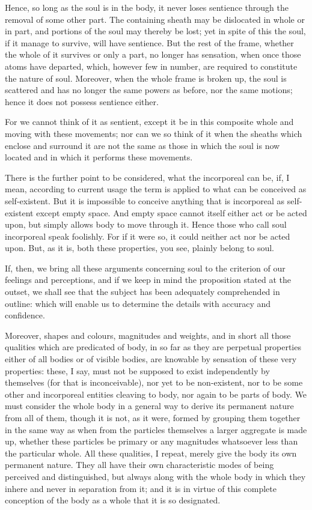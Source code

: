 \documentclass{stex}
\begin{document}
Hence, so long as the soul is in the body, it never loses sentience through the removal of some other part.
The containing sheath may be dislocated in whole or in part, and portions of the soul may thereby be lost; yet in spite of this the soul, if it manage to survive, will have sentience.
But the rest of the frame, whether the whole of it survives or only a part, no longer has sensation, when once those atoms have departed, which, however few in number, are required to constitute the nature of soul.
Moreover, when the whole frame is broken up, the soul is scattered and has no longer the same powers as before, nor the same motions; hence it does not possess sentience either.

For we cannot think of it as sentient, except it be in this composite whole and moving with these movements; nor can we so think of it when the sheaths which enclose and surround it are not the same as those in which the soul is now located and in which it performs these movements.

There is the further point to be considered, what the incorporeal can be, if, I mean, according to current usage the term is applied to what can be conceived as self-existent.
But it is impossible to conceive anything that is incorporeal as self-existent except empty space.
And empty space cannot itself either act or be acted upon, but simply allows body to move through it.
Hence those who call soul incorporeal speak foolishly.
For if it were so, it could neither act nor be acted upon.
But, as it is, both these properties, you see, plainly belong to soul.

If, then, we bring all these arguments concerning soul to the criterion of our feelings and perceptions, and if we keep in mind the proposition stated at the outset, we shall see that the subject has been adequately comprehended in outline: which will enable us to determine the details with accuracy and confidence.

Moreover, shapes and colours, magnitudes and weights, and in short all those qualities which are predicated of body, in so far as they are perpetual properties either of all bodies or of visible bodies, are knowable by sensation of these very properties: these, I say, must not be supposed to exist independently by themselves (for that is inconceivable), nor yet to be non-existent, nor to be some other and incorporeal entities cleaving to body, nor again to be parts of body.
We must consider the whole body in a general way to derive its permanent nature from all of them, though it is not, as it were, formed by grouping them together in the same way as when from the particles themselves a larger aggregate is made up, whether these particles be primary or any magnitudes whatsoever less than the particular whole.
All these qualities, I repeat, merely give the body its own permanent nature.
They all have their own characteristic modes of being perceived and distinguished, but always along with the whole body in which they inhere and never in separation from it; and it is in virtue of this complete conception of the body as a whole that it is so designated.
\end{document}
